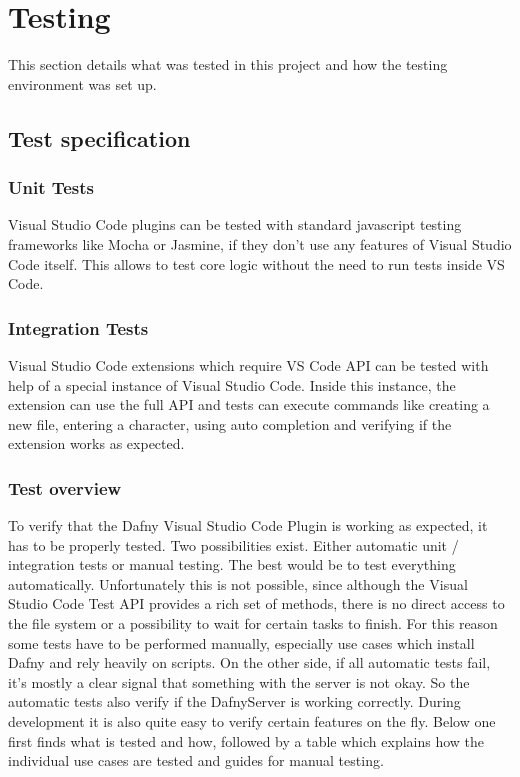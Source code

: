 \section{Testing}
This section details what was tested in this project and how the testing environment was set up.
\subsection{Test specification}
\subsubsection{Unit Tests}
Visual Studio Code plugins can be tested with standard javascript testing frameworks like Mocha or Jasmine, if they don't use any features of Visual Studio Code itself. This allows to test core logic without the need to run tests inside VS Code.
\subsubsection{Integration Tests}
Visual Studio Code extensions which require VS Code API can be tested with help of a special instance of Visual Studio Code. Inside this instance, the extension can use the full API and tests can execute commands like creating a new file, entering a character, using auto completion and verifying if the extension works as expected.   
\subsubsection{Test overview}
To verify that the Dafny Visual Studio Code Plugin is working as expected, it has to be properly tested. Two possibilities exist. Either automatic unit / integration tests or manual testing. The best would be to test everything automatically. Unfortunately this is not possible, since although the Visual Studio Code Test API provides a rich set of methods, there is no direct access to the file system or a possibility to wait for certain tasks to finish. For this reason some tests have to be performed manually, especially use cases which install Dafny and rely heavily on scripts. On the other side, if all automatic tests fail, it's mostly a clear signal that something with the server is not okay. So the automatic tests also verify if the DafnyServer is working correctly. During development it is also quite easy to verify certain features on the fly. 
Below one first finds what is tested and how, followed by a table which explains how the individual use cases are tested and guides for manual testing. 

